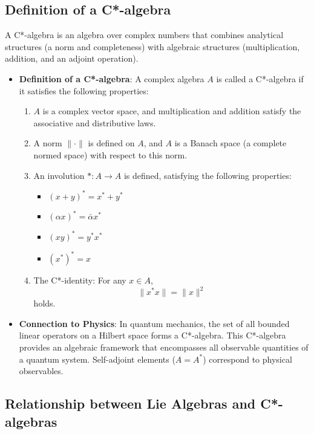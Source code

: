 \documentclass[uplatex,a4j,12pt,dvipdfmx]{article}
\begin{document}
\subsection{Definition of a C*-algebra}

A C*-algebra is an algebra over complex numbers that combines analytical structures (a norm and completeness) with algebraic structures (multiplication, addition, and an adjoint operation).

\begin{itemize}
    \item \textbf{Definition of a C*-algebra}:
    A complex algebra $A$ is called a C*-algebra if it satisfies the following properties:
    \begin{enumerate}
        \item $A$ is a complex vector space, and multiplication and addition satisfy the associative and distributive laws.
        \item A norm $\|\cdot\|$ is defined on $A$, and $A$ is a Banach space (a complete normed space) with respect to this norm.
        \item An involution $*: A \to A$ is defined, satisfying the following properties:
        \begin{itemize}
            \item $(x+y)^* = x^*+y^*$
            \item $(\alpha x)^* = \bar{\alpha} x^*$
            \item $(xy)^* = y^*x^*$
            \item $(x^*)^* = x$
        \end{itemize}
        \item The C*-identity: For any $x \in A$,
        \[
            \|x^*x\| = \|x\|^2
        \]
        holds.
    \end{enumerate}
    \item \textbf{Connection to Physics}:
    In quantum mechanics, the set of all bounded linear operators on a Hilbert space forms a C*-algebra. This C*-algebra provides an algebraic framework that encompasses all observable quantities of a quantum system. Self-adjoint elements ($A=A^*$) correspond to physical observables.
\end{itemize}

\subsection{Relationship between Lie Algebras and C*-algebras}
\end{document}
